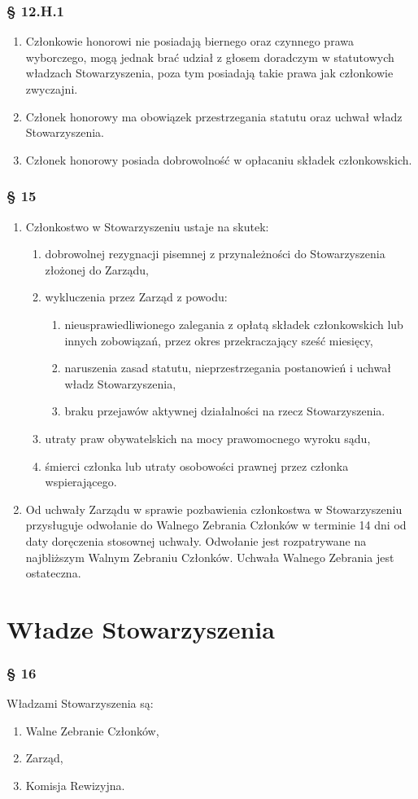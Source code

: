 \documentclass{article}
\newcommand{\myparagraph}[1]{\subsubsection*{#1}}
\begin{document}
\myparagraph{§ 12.H.1}
\begin{enumerate}
\item
  Członkowie honorowi nie posiadają biernego oraz czynnego prawa wyborczego, mogą jednak brać udział z głosem doradczym w statutowych władzach Stowarzyszenia, poza tym posiadają takie prawa jak członkowie zwyczajni.
\item
  Członek honorowy ma obowiązek przestrzegania statutu oraz uchwał władz Stowarzyszenia. 
\item
  Członek honorowy posiada dobrowolność w opłacaniu składek członkowskich.
\end{enumerate}


\myparagraph{§ 15}
\begin{enumerate}
\item
  Członkostwo w Stowarzyszeniu ustaje na skutek:
  \begin{enumerate}
  \def\labelenumii{\alph{enumii}.}
  \item
    dobrowolnej rezygnacji pisemnej z przynależności do Stowarzyszenia złożonej do Zarządu,
  \item
    wykluczenia przez Zarząd z powodu:
    \begin{enumerate}
    \def\labelenumiii{\roman{enumiii}.}
    \item
      nieusprawiedliwionego zalegania z opłatą składek członkowskich lub innych zobowiązań, przez okres przekraczający sześć miesięcy,
    \item
      naruszenia zasad statutu, nieprzestrzegania postanowień i uchwał władz Stowarzyszenia,
    \item
      braku przejawów aktywnej działalności na rzecz Stowarzyszenia.
    \end{enumerate}
  \item
    utraty praw obywatelskich na mocy prawomocnego wyroku sądu,
  \item
    śmierci członka lub utraty osobowości prawnej przez członka
    wspierającego.
  \end{enumerate}
\item
  Od uchwały Zarządu w sprawie pozbawienia członkostwa w Stowarzyszeniu przysługuje odwołanie do Walnego Zebrania Członków w terminie 14 dni od daty doręczenia stosownej uchwały. Odwołanie jest rozpatrywane na najbliższym Walnym Zebraniu Członków. Uchwała Walnego Zebrania jest ostateczna.
\end{enumerate}

\section{Władze Stowarzyszenia}
\myparagraph{§ 16}
Władzami Stowarzyszenia są:
\begin{enumerate}
\item
  Walne Zebranie Członków,
\item
  Zarząd,
\item
  Komisja Rewizyjna.
\end{enumerate}
\end{document}
